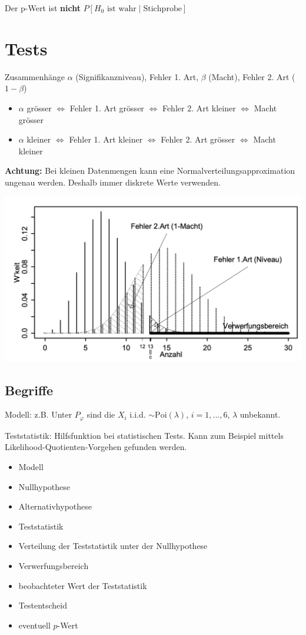 Der p-Wert ist \textbf{nicht} $P[H_0 \text{ ist wahr} \mid \text{Stichprobe}]$

\section{Tests}

Zusammenhänge $\alpha$ (Signifikanzniveau), Fehler 1. Art, $\beta$ (Macht), Fehler 2. Art ($1-\beta$)

\begin{itemize}
	\item $\alpha$ grösser $\iff$ Fehler 1. Art grösser $\iff$ Fehler 2. Art kleiner $\iff$ Macht grösser
	\item $\alpha$ kleiner $\iff$ Fehler 1. Art kleiner $\iff$ Fehler 2. Art grösser $\iff$ Macht kleiner
\end{itemize}

\textbf{Achtung:} Bei kleinen Datenmengen kann eine Normalverteilungsapproximation ungenau werden. Deshalb immer diskrete Werte verwenden.

\includegraphics[width=.8\textwidth]{images/normal.png}

\subsection{Begriffe}

Modell: z.B. Unter $P_\varphi$ sind die $X_i$ i.i.d. $\sim\text{Poi}(\lambda)$, $i=1, ..., 6$, $\lambda$ unbekannt.

Teststatistik: Hilfsfunktion bei statistischen Tests. Kann zum Beispiel mittels Likelihood-Quotienten-Vorgehen gefunden werden.


\begin{itemize}
	\item Modell
	\item Nullhypothese
	\item Alternativhypothese
	\item Teststatistik
	\item Verteilung der Teststatistik unter der Nullhypothese
	\item Verwerfungsbereich
	\item beobachteter Wert der Teststatistik
	\item Testentscheid
	\item eventuell $p$-Wert
\end{itemize}


